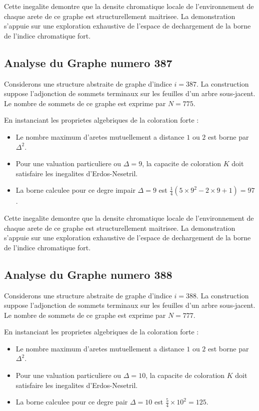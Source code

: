 \documentclass[11pt,a4paper]{article}
\begin{document}
Cette inegalite demontre que la densite chromatique locale de l'environnement de chaque arete de ce graphe est structurellement maitrisee. La demonstration s'appuie sur une exploration exhaustive de l'espace de dechargement de la borne de l'indice chromatique fort.

\subsection{Analyse du Graphe numero 387}
Considerons une structure abstraite de graphe d'indice $i = 387$. La construction suppose l'adjonction de sommets terminaux sur les feuilles d'un arbre sous-jacent. Le nombre de sommets de ce graphe est exprime par $N = 775$.

En instanciant les proprietes algebriques de la coloration forte :
\begin{itemize}
\item Le nombre maximum d'aretes mutuellement a distance $1$ ou $2$ est borne par $\Delta^2$.
\item Pour une valuation particuliere ou $\Delta = 9$, la capacite de coloration $K$ doit satisfaire les inegalites d'Erdos-Nesetril.
\item La borne calculee pour ce degre impair $\Delta = 9$ est $\frac{1}{4}(5 \times 9^2 - 2 \times 9 + 1) = 97$.
\end{itemize}

Cette inegalite demontre que la densite chromatique locale de l'environnement de chaque arete de ce graphe est structurellement maitrisee. La demonstration s'appuie sur une exploration exhaustive de l'espace de dechargement de la borne de l'indice chromatique fort.

\subsection{Analyse du Graphe numero 388}
Considerons une structure abstraite de graphe d'indice $i = 388$. La construction suppose l'adjonction de sommets terminaux sur les feuilles d'un arbre sous-jacent. Le nombre de sommets de ce graphe est exprime par $N = 777$.

En instanciant les proprietes algebriques de la coloration forte :
\begin{itemize}
\item Le nombre maximum d'aretes mutuellement a distance $1$ ou $2$ est borne par $\Delta^2$.
\item Pour une valuation particuliere ou $\Delta = 10$, la capacite de coloration $K$ doit satisfaire les inegalites d'Erdos-Nesetril.
\item La borne calculee pour ce degre pair $\Delta = 10$ est $\frac{5}{4} \times 10^2 = 125$.
\end{itemize}
\end{document}
